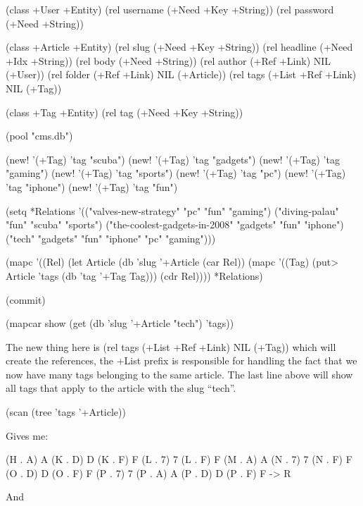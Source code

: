 \begin{wideverbatim}
(class +User +Entity)
(rel username (+Need +Key +String))
(rel password (+Need +String))

(class +Article +Entity)
(rel slug     (+Need +Key +String))
(rel headline (+Need +Idx +String))
(rel body     (+Need +String))
(rel author   (+Ref +Link) NIL (+User))
(rel folder   (+Ref +Link) NIL (+Article))
(rel tags     (+List +Ref +Link) NIL (+Tag))

(class +Tag +Entity)
(rel tag (+Need +Key +String))

(pool "cms.db")

(new! '(+Tag) 'tag "scuba")
(new! '(+Tag) 'tag "gadgets")
(new! '(+Tag) 'tag "gaming")
(new! '(+Tag) 'tag "sports")
(new! '(+Tag) 'tag "pc")
(new! '(+Tag) 'tag "iphone")
(new! '(+Tag) 'tag "fun")

(setq *Relations '(("valves-new-strategy" "pc" "fun" "gaming")
                   ("diving-palau" "fun" "scuba" "sports")
                   ("the-coolest-gadgets-in-2008" "gadgets" "fun" "iphone")
                   ("tech" "gadgets" "fun" "iphone" "pc" "gaming")))

(mapc
 '((Rel)
   (let Article (db 'slug '+Article (car Rel))
     (mapc 
      '((Tag)
        (put> Article 'tags (db 'tag '+Tag Tag))) 
      (cdr Rel)))) 
 *Relations)

(commit)

(mapcar show (get (db 'slug '+Article "tech") 'tags))
\end{wideverbatim}

The new thing here is (rel tags (+List +Ref +Link) NIL (+Tag)) which
will create the references, the +List prefix is responsible for handling
the fact that we now have many tags belonging to the same article. The
last line above will show all tags that apply to the article with the
slug ``tech''.


\begin{wideverbatim}
(scan (tree 'tags '+Article))
\end{wideverbatim}

Gives me:


\begin{wideverbatim}
({H} . {A}) {A}
({K} . {D}) {D}
({K} . {F}) {F}
({L} . {7}) {7}
({L} . {F}) {F}
({M} . {A}) {A}
({N} . {7}) {7}
({N} . {F}) {F}
({O} . {D}) {D}
({O} . {F}) {F}
({P} . {7}) {7}
({P} . {A}) {A}
({P} . {D}) {D}
({P} . {F}) {F}
-> {R}
\end{wideverbatim}

And


